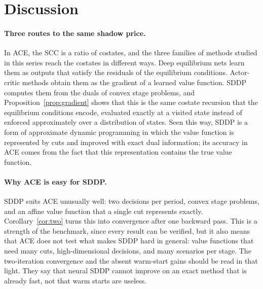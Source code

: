 \section{Discussion}
\label{sec:discussion}

\paragraph{Three routes to the same shadow price.} In ACE, the SCC is a ratio of costates, and the three families of methods studied in this series reach the costates in different ways. Deep equilibrium nets learn them as outputs that satisfy the residuals of the equilibrium conditions. Actor-critic methods obtain them as the gradient of a learned value function. SDDP computes them from the duals of convex stage problems, and Proposition~\ref{prop:gradient} shows that this is the same costate recursion that the equilibrium conditions encode, evaluated exactly at a visited state instead of enforced approximately over a distribution of states. Seen this way, SDDP is a form of approximate dynamic programming in which the value function is represented by cuts and improved with exact dual information; its accuracy in ACE comes from the fact that this representation contains the true value function.

\paragraph{Why ACE is easy for SDDP.} SDDP suits ACE unusually well: two decisions per period, convex stage problems, and an affine value function that a single cut represents exactly. Corollary~\ref{cor:two} turns this into convergence after one backward pass. This is a strength of the benchmark, since every result can be verified, but it also means that ACE does not test what makes SDDP hard in general: value functions that need many cuts, high-dimensional decisions, and many scenarios per stage. The two-iteration convergence and the absent warm-start gains should be read in that light. They say that neural SDDP cannot improve on an exact method that is already fast, not that warm starts are useless.


